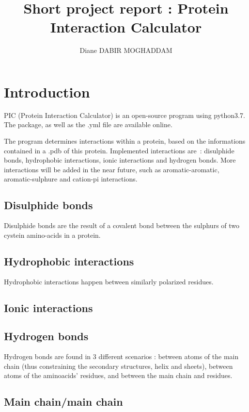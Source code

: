 \documentclass[]{article}
\title{Short project report : Protein Interaction Calculator}
\author{Diane DABIR MOGHADDAM}
\begin{document}
\maketitle

\begin{abstract}

\end{abstract}

\section{Introduction}
PIC (Protein Interaction Calculator) is an open-source program using python3.7.
The package, as well as the .yml file are available online.

The program determines interactions within a protein, based on the informations contained in a .pdb of this protein.
Implemented interactions are : disulphide bonds, hydrophobic interactions, ionic interactions and hydrogen bonds.
More interactions will be added in the near future, such as aromatic-aromatic, aromatic-sulphure and cation-pi interactions.

\subsection{Disulphide bonds}
Disulphide bonds are the result of a covalent bond between the sulphurs of two cystein amino-acids in a protein.

\subsection{Hydrophobic interactions}
Hydrophobic interactions happen between similarly polarized residues.

\subsection{Ionic interactions}

\subsection{Hydrogen bonds}
Hydrogen bonds are found in 3 different scenarios : between atoms of the main chain (thus constraining the secondary structures, helix and sheets), between atoms of the aminoacids' residues, and between the main chain and residues.
\subsection{Main chain/main chain}
\end{document}
